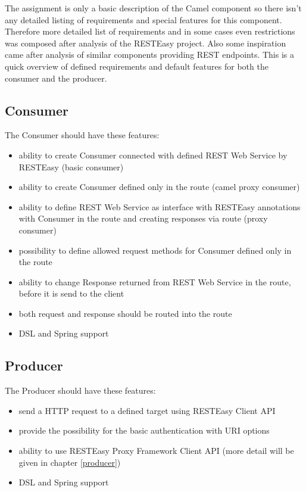 \documentclass[12pt,final,oneside]{fithesis2}
\begin{document}
The assignment is only a basic description of the Camel component so there isn't any detailed listing of requirements and special features for this component. Therefore more detailed list of requirements and in some cases even restrictions was composed after analysis of the RESTEasy project. Also some inspiration came after analysis of similar components providing REST endpoints. This is a quick overview of defined requirements and default features for both the consumer and the producer.

\subsection{Consumer}
The Consumer should have these features:

\begin{itemize}
\item
 ability to create Consumer connected with defined REST Web Service by RESTEasy (basic consumer)

\item
ability to create Consumer defined only in the route (camel proxy consumer)

\item
ability to define REST Web Service as interface with RESTEasy annotations with Consumer in the route and creating responses via route (proxy consumer)

\item
possibility to define allowed request methods for Consumer defined only in the route


\item
ability to change Response returned from REST Web Service in the route, before it is send to the client 

\item
both request and response should be routed into the route

\item
DSL and Spring support


\end{itemize}

\subsection{Producer}
The Producer should have these features:
\begin{itemize}
\item
send a HTTP request to a defined target using RESTEasy Client API

\item
provide the possibility for the basic authentication with URI options

\item
ability to use RESTEasy Proxy Framework Client API (more detail will be given in chapter \ref{producer})

\item
DSL and Spring support
\end{itemize}
\end{document}
